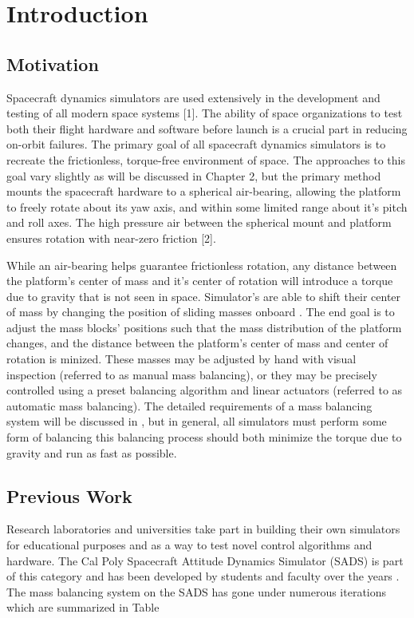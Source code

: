 \chapter{Introduction}

\section{Motivation}
Spacecraft dynamics simulators are used extensively in the development and testing of all modern space systems [1]. The ability of space organizations to test both their flight hardware and software before launch is a crucial part in reducing on-orbit
failures. The primary goal of all spacecraft dynamics simulators is to recreate the frictionless, torque-free environment of space. The approaches to this goal vary slightly as will be discussed in Chapter 2, but the primary method mounts the spacecraft hardware to a spherical air-bearing, allowing the platform to freely rotate about its yaw axis, and within some limited range about it's pitch and roll axes. The high pressure air between the spherical mount and platform ensures rotation with near-zero friction [2].

While an air-bearing helps guarantee frictionless rotation, any distance between the platform's center of mass and it's center of rotation will introduce a torque due to gravity that is not seen in space. Simulator's are able to shift their center of mass by changing the position of sliding masses onboard \cite{kim_automatic_2009}. The end goal is to adjust the mass blocks' positions such that the mass distribution of the platform changes, and the distance between the platform's center of mass and center of rotation is minized. These masses may be adjusted by hand with visual inspection (referred to as manual mass balancing), or they may be precisely controlled using a preset balancing algorithm and linear actuators (referred to as automatic mass balancing). The detailed requirements of a mass balancing system will be discussed in , but in general, all simulators must perform some form of balancing this balancing process should both minimize the torque due to gravity and run as fast as possible.



\section{Previous Work}

Research laboratories and universities take part in building their own simulators for educational purposes and as a way to test novel control algorithms and hardware. The Cal Poly Spacecraft Attitude Dynamics Simulator (SADS) is part of this category and has been developed by students and faculty over the years \cite{mittelsteadt_cal_2007}. The mass balancing system on the SADS has gone under numerous iterations which are summarized in Table



